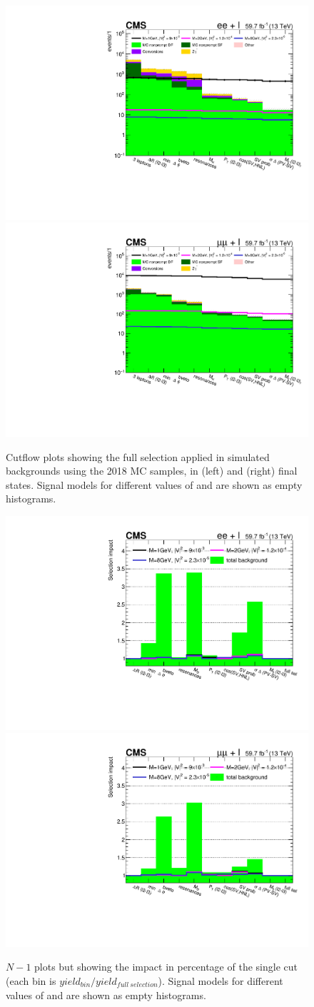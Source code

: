 \begin{figure}[h!]
\centering
  \includegraphics[clip,trim=0.9cm 0.7cm 0.7cm 0.7cm,width=.4\textwidth]{Figures/c6/selection/18/e_cutflow__0.pdf}
  \includegraphics[clip,trim=0.9cm 0.7cm 0.7cm 0.7cm,width=.4\textwidth]{Figures/c6/selection/18/mu_cutflow__0.pdf}\\
  \caption{Cutflow plots showing the full selection applied in simulated backgrounds using the 2018 MC samples,
    in \eex (left) and \mmx (right) final states.
    Signal models for different values of \mhnl and \mixpar
    are shown as empty histograms.}
  \label{fig:cutflow1}
\end{figure}

\begin{figure}[h!]
\centering
   \includegraphics[clip,trim=0.9cm 0.7cm 0.7cm 0.7cm,width=.4\textwidth]{Figures/c6/selection/eff_e_cutflow_n_1__0.pdf}
  \includegraphics[clip,trim=0.9cm 0.7cm 0.7cm 0.7cm,width=.4\textwidth]{Figures/c6/selection/eff_mu_cutflow_n_1__0.pdf}
  \caption{
   $N-1$ plots but showing the impact in percentage of the single cut (each bin is $yield_{bin}/yield_{full\:selection}$).
    Signal models for different values of \mhnl and \mixpar
    are shown as empty histograms.}
  \label{fig:cutflow2}
\end{figure}
\vspace{2mm}


